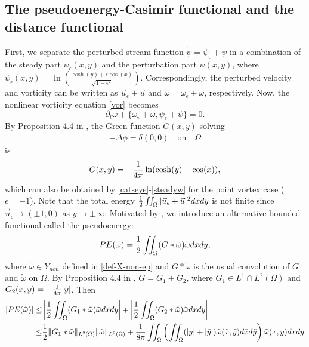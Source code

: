 \documentclass[1 [leqno, 11pt]{amsart}
\numberwithin{equation}{section}
\let\ep=\epsilon
\begin{document}
\begin{CJK*}{GBK}{song}
\subsection{The pseudoenergy-Casimir  functional and the distance functional}
First, we separate the perturbed stream function $\tilde \psi=\psi_\ep+\psi$ in a combination of the steady part $\psi_{\ep}(x, y)$ and the perturbation part  $\psi(x,y)$,
where $\psi_{\ep}(x, y)=\ln \left(\frac{\cosh (y) + \epsilon \cos (x)}{\sqrt{1-\epsilon^2}}\right)$. Correspondingly, the perturbed  velocity and vorticity can be written as $\vec{u}_\ep+\vec{u}$ and $\tilde\omega=\omega_\ep + \omega$, respectively. Now, the nonlinear vorticity equation \eqref{vor} becomes
\begin{equation}\label{vorr}
\partial_t \omega + \{\omega_\ep + \omega, \psi_\ep + \psi\} = 0.
\end{equation}
By Proposition 4.4 in \cite{Milisic-Razafison13}, the Green function $G(x,y)$ solving
\begin{align*}
-\Delta \phi=\delta(0,0) \quad \text{on}\quad \Omega
\end{align*}
is
\begin{align}\label{green function}
G(x,y)=-{1\over 4\pi}\ln(\cosh(y)-\cos(x)),
\end{align}
which can also be obtained by   \eqref{catseye}-\eqref{steadyw} for the point vortex case ($\ep=-1$). Note that the total  energy ${1\over2}\iint_{\Omega}|\vec{u}_\ep+\vec{u}|^2dxdy$ is not finite since $\vec{u}_\ep\to(\pm1,0)$ as $y\to \pm \infty$.
Motivated by \cite{Majda-Bertozzi02}, we introduce an alternative bounded  functional called the pseudoenergy:
\begin{align}\label{def-pseudoenergy}
PE(\tilde \omega)={1\over2}\iint_{\Omega}(G\ast\tilde \omega)\tilde \omega dxdy,
\end{align}
where $\tilde\omega\in Y_{non}$ defined in \eqref{def-X-non-ep} and $G\ast\tilde \omega$ is the usual convolution of $G$ and $\tilde \omega$ on $\Omega$.
By Proposition 4.4 in  \cite{Milisic-Razafison13}, $G=G_1+G_2$, where $G_1\in L^1\cap L^2(\Omega)$ and $G_2(x,y)=-{1\over4\pi} |y|$.
Then
\begin{align}\nonumber
|PE(\tilde \omega)|\leq& \left|{1\over2}\iint_{\Omega}(G_1\ast\tilde \omega)\tilde \omega dxdy\right|
+\left|{1\over2}\iint_{\Omega}(G_2\ast\tilde \omega)\tilde \omega dxdy\right|\\\nonumber
\leq &{1\over2}\|G_1\ast\tilde \omega\|_{L^2(\Omega)}\|\tilde \omega\|_{L^2(\Omega)}+{1\over8\pi}\iint_{\Omega}\left(\iint_{\Omega}(|y|+|\tilde y|)\tilde \omega(\tilde x,\tilde y)d\tilde x d\tilde y\right)\tilde \omega(x,y) dxdy\\\label{PE-finite}

\end{align}
\end{CJK*}
\end{document}
